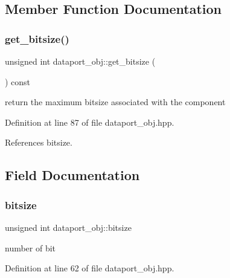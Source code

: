 \subsection{Member Function Documentation}
\mbox{\label{classdataport__obj_ae5c059193354235bc33d52f679e5bded}} 
\subsubsection{\texorpdfstring{get\+\_\+bitsize()}{get\_bitsize()}}
{\footnotesize\ttfamily unsigned int dataport\+\_\+obj\+::get\+\_\+bitsize (\begin{DoxyParamCaption}{ }\end{DoxyParamCaption}) const\hspace{0.3cm}{\ttfamily [inline]}}



return the maximum bitsize associated with the component 



Definition at line 87 of file dataport\+\_\+obj.\+hpp.



References bitsize.



\subsection{Field Documentation}
\mbox{\label{classdataport__obj_a005b5dfdb4876cc28467322baadebca8}} 
\subsubsection{\texorpdfstring{bitsize}{bitsize}}
{\footnotesize\ttfamily unsigned int dataport\+\_\+obj\+::bitsize\hspace{0.3cm}{\ttfamily [private]}}



number of bit 



Definition at line 62 of file dataport\+\_\+obj.\+hpp.



